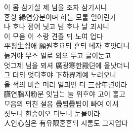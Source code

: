 이 몸 삼기실 제 님을 조차 삼기시니\\
ᄒᆞᆫᄉᆡᆼ 緣연分분이며 하ᄂᆞᆯ 모ᄅᆞᆯ 일이런가\\
나 ᄒᆞ나 졈어 닛고 님 ᄒᆞ나 날 괴시니\\
이 ᄆᆞ음 이 ᄉᆞ랑 견졸 ᄃᆡ 노여 업다\\
平평生ᄉᆡᆼ애 願원ᄒᆞ요ᄃᆡ ᄒᆞᆫᄃᆡ 녜자 ᄒᆞ얏더니\\
늙거야 무ᄉᆞ 일로 외오 두고 글이ᄂᆞᆫ고\\
엇그제 님을 뫼셔 廣광寒한殿뎐에 올낫더니\\
그 더ᄃᆡ 엇디ᄒᆞ야 下하界계예 ᄂᆞ려오니\\
올 적의 비슨 머리 얼킈연 디 三삼年년이라\\
臙연脂지粉분 잇ᄂᆡᆷᄂᆞᆫ 눌 위ᄒᆞ야 고이 ᄒᆞᆯ고\\
ᄆᆞ음의 ᄆᆡ친 설음 疊텹疊텹이 ᄡᅡ여 이셔\\
짓ᄂᆞ니 한숨이오 디ᄂᆞ니 눈믈이라\\
人인心심은 有유限ᄒᆞᆫᄒᆞᆫᄃᆡ 시ᄅᆞᆷ도 그지업다